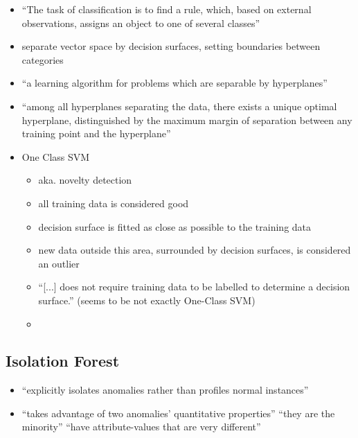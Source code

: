	\begin{itemize}
		\item \enquote{The task of classification is to find a rule, which, based on external observations, assigns an object to one of several classes} \parencite{Muller2001}
		\item separate vector space by decision surfaces, setting boundaries between categories \parencite{Muller2001}
		\item \enquote{a learning algorithm for problems which are separable by hyperplanes} \parencite{Scholkopf2001a}
		\item \enquote{among all hyperplanes separating the data, there exists a unique optimal hyperplane, distinguished by the maximum margin of separation between any training point and the hyperplane} \parencite{Scholkopf2001a}
		
		\item One Class SVM
			\begin{itemize}
				\item aka. novelty detection
				\item all training data is considered good
				\item decision surface is fitted as close as possible to the training data
				\item new data outside this area, surrounded by decision surfaces, is considered an outlier
				\item \enquote{[...] does not require training data to be labelled to determine a decision surface.} \parencite{Lazarevic2003} (seems to be not exactly One-Class SVM)
				\item 
			\end{itemize}
	\end{itemize}
	
	\subsection{Isolation Forest}
	\label{sec:background:network:novelty:isoforest}
	
	\begin{itemize}
		\item \enquote{explicitly isolates anomalies rather than profiles normal instances} \parencite{Liu2008}
		\item \enquote{takes advantage of two anomalies’ quantitative properties} \parencite{Liu2008}
			\subitem \enquote{they are the minority}
			\subitem \enquote{have attribute-values that are very different}
	\end{itemize}
	

